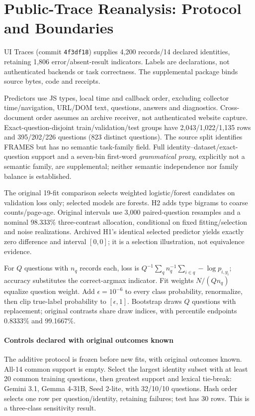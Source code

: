 \section{Public-Trace Reanalysis: Protocol and Boundaries}
\label{app:public-traces}
UI Traces (commit \texttt{4f3df18}) supplies 4,200 records/14 declared identities, retaining 1,806 error/absent-result indicators. Labels are declarations, not authenticated backends or task correctness. The supplemental package binds source bytes, code and receipts.


Predictors use JS types, local time and callback order, excluding collector time/navigation, URL/DOM text, questions, answers and diagnostics. Cross-document order assumes an archive receiver, not authenticated website capture. Exact-question-disjoint train/validation/test groups have 2,043/1,022/1,135 rows and 395/202/226 questions (823 distinct questions). The source split identifies FRAMES but has no semantic task-family field. Full identity--dataset/exact-question support and a seven-bin first-word \emph{grammatical proxy}, explicitly not a semantic family, are supplemental; neither semantic independence nor family balance is established.

The original 19-fit comparison selects weighted logistic/forest candidates on validation loss only; selected models are forests. H2 adds type bigrams to coarse counts/page-age. Original intervals use 3,000 paired-question resamples and a nominal 98.333\% three-contrast allocation, conditional on fixed fitting/selection and noise realizations. Archived H1's identical selected predictor yields exactly zero difference and interval $[0,0]$; it is a selection illustration, not equivalence evidence.

For $Q$ questions with $n_q$ records each, loss is $Q^{-1}\sum_q n_q^{-1}\sum_{i\in q}-\log p_{i,y_i}$; accuracy substitutes the correct-argmax indicator. Fit weights $N/(Qn_q)$ equalize question weight. Add $\epsilon=10^{-6}$ to every class probability, renormalize, then clip true-label probability to $[\epsilon,1]$. Bootstrap draws $Q$ questions with replacement; original contrasts share draw indices, with percentile endpoints 0.8333\% and 99.1667\%.

\paragraph{Controls declared with original outcomes known}
The additive protocol is frozen before new fits, with original outcomes known. All-14 common support is empty. Select the largest identity subset with at least 20 common training questions, then greatest support and lexical tie-break: Gemini 3.1, Gemma 4-31B, Seed 2-lite, with 32/10/10 questions. Hash order selects one row per question/identity, retaining failures; test has 30 rows. This is a three-class sensitivity result.

